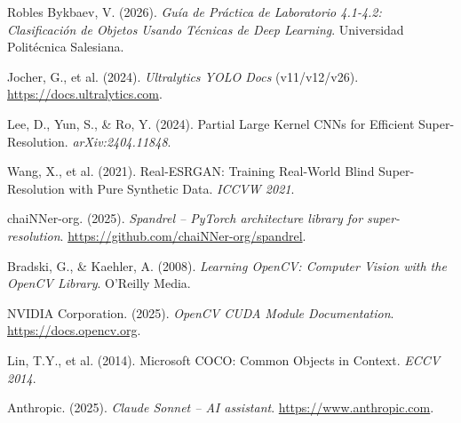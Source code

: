 \documentclass[12pt,a4paper]{article}
\begin{document}
\begin{enumerate}[label={[\arabic*]}]
  \item Robles Bykbaev, V. (2026). \textit{Guía de Práctica de Laboratorio 4.1-4.2: Clasificación de Objetos Usando Técnicas de Deep Learning}. Universidad Politécnica Salesiana.

  \item Jocher, G., et al. (2024). \textit{Ultralytics YOLO Docs} (v11/v12/v26). \url{https://docs.ultralytics.com}.

  \item Lee, D., Yun, S., \& Ro, Y. (2024). Partial Large Kernel CNNs for Efficient Super-Resolution. \textit{arXiv:2404.11848}.

  \item Wang, X., et al. (2021). Real-ESRGAN: Training Real-World Blind Super-Resolution with Pure Synthetic Data. \textit{ICCVW 2021}.

  \item chaiNNer-org. (2025). \textit{Spandrel -- PyTorch architecture library for super-resolution}. \url{https://github.com/chaiNNer-org/spandrel}.

  \item Bradski, G., \& Kaehler, A. (2008). \textit{Learning OpenCV: Computer Vision with the OpenCV Library}. O'Reilly Media.

  \item NVIDIA Corporation. (2025). \textit{OpenCV CUDA Module Documentation}. \url{https://docs.opencv.org}.

  \item Lin, T.Y., et al. (2014). Microsoft COCO: Common Objects in Context. \textit{ECCV 2014}.

  \item Anthropic. (2025). \textit{Claude Sonnet -- AI assistant}. \url{https://www.anthropic.com}.
\end{enumerate}
\end{document}
